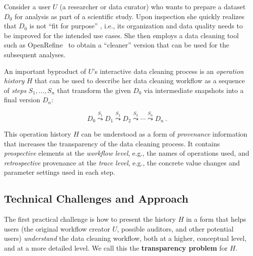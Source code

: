 \documentclass[conference]{ijdc-v14}
\newcommand{\openrefine}{\textrm{OpenRefine}\xspace}
\begin{document}
Consider a user $U$ (a researcher or data curator) who wants to prepare a dataset $D_0$ for
analysis as part of a scientific study. Upon inspection she quickly realizes that $D_0$ is not ``fit
for purpose'' \cite{chapman2020developing}, i.e., its organization and data quality needs to be
improved for the intended use cases. She then employs a data cleaning tool such as
\openrefine~\cite{openrefine2020} to obtain a ``cleaner'' version that can be used for the
subsequent analyses.

An important byproduct of $U$'s interactive data cleaning process is an \emph{operation history} $H$
that can be used to describe her data cleaning workflow as a sequence of \emph{steps}
$S_1,\dots, S_n$ that transform the given $D_0$ via intermediate snapshots  into a final version
$D_n$: 

\begin{equation}
  D_0 \stackrel{S_1}{\leadsto} D_1 \stackrel{S_2}{\leadsto} D_2 \stackrel{S_3}{\leadsto} \cdots
  \stackrel{S_n}{\leadsto}  D_n ~. \label{eq-wf-history} \tag{$H$}
 \end{equation}

 This operation history $H$ can be understood as a form of \emph{provenance} information that increases
 the transparency of the data cleaning process. It contains \emph{prospective} elements at the
 \emph{workflow level}, e.g., the names of operations used, and \emph{retrospective} provenance at
 the \emph{trace level}, e.g., the concrete value changes and parameter settings used in each step.

\subsection{Technical Challenges and Approach}

The first practical challenge is how to present the history $H$ in a form that helps users (the
original workflow creator $U$, possible auditors, and other potential users) \emph{understand}
the data cleaning workflow, both at a higher, conceptual level, and at a more detailed level. We
call this the \textbf{transparency problem} for $H$.
\end{document}
